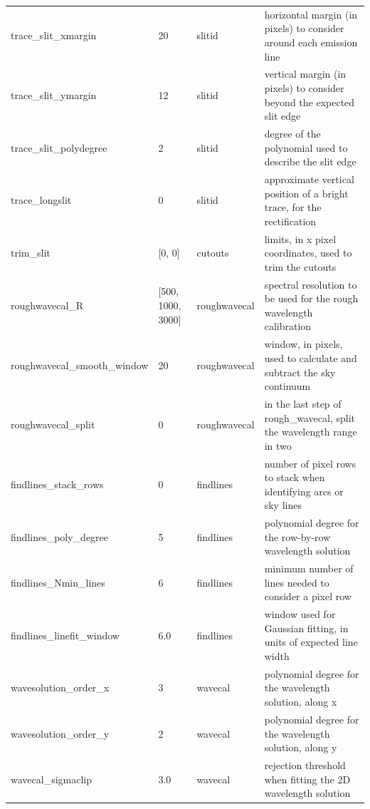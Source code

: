 \documentclass[a4paper]{article}
\begin{document}
\begin{sloppypar}
\begin{table}
{\begin{tabular}{llll}
    trace\_slit\_xmargin          & 20            & slitid           & horizontal margin (in pixels) to consider around each emission line \\
    trace\_slit\_ymargin          & 12            & slitid           & vertical margin (in pixels) to consider beyond the expected slit edge \\
    trace\_slit\_polydegree       & 2             & slitid           & degree of the polynomial used to describe the slit edge \\
    trace\_longslit               & 0             & slitid           & approximate vertical position of a bright trace, for the rectification \\
    trim\_slit                    & [0, 0]        & cutouts          & limits, in x pixel coordinates, used to trim the cutouts \\
    roughwavecal\_R               & [500, 1000, 3000] & roughwavecal & spectral resolution to be used for the rough wavelength calibration \\
    roughwavecal\_smooth\_window  & 20            & roughwavecal     & window, in pixels, used to calculate and subtract the sky continuum \\
    roughwavecal\_split           & 0             & roughwavecal     & in the last step of rough\_wavecal, split the wavelength range in two \\
    findlines\_stack\_rows        & 0             & findlines        & number of pixel rows to stack when identifying arcs or sky lines \\
    findlines\_poly\_degree       & 5             & findlines        & polynomial degree for the row-by-row wavelength solution \\
    findlines\_Nmin\_lines        & 6             & findlines        & minimum number of lines needed to consider a pixel row \\
    findlines\_linefit\_window    & 6.0           & findlines        & window used for Gaussian fitting, in units of expected line width \\
    wavesolution\_order\_x        & 3             & wavecal          & polynomial degree for the wavelength solution, along x \\
    wavesolution\_order\_y        & 2             & wavecal          & polynomial degree for the wavelength solution, along y \\
    wavecal\_sigmaclip            & 3.0           & wavecal          & rejection threshold when fitting the 2D wavelength solution \\

\end{tabular}}
\end{table}
\end{sloppypar}
\end{document}
